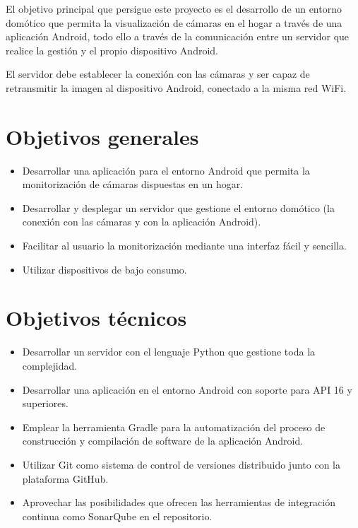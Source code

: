 
El objetivo principal que persigue este proyecto es el desarrollo de un entorno domótico que permita la visualización de cámaras en el hogar a través de una aplicación Android, todo ello a través de la comunicación entre un servidor que realice la gestión y el propio dispositivo Android.

El servidor debe establecer la conexión con las cámaras y ser capaz de retransmitir la imagen al dispositivo Android, conectado a la misma red WiFi. 

\section{Objetivos generales}\label{objetivos-generales}

\begin{itemize}
\tightlist
\item
  Desarrollar una aplicación para el entorno Android que permita la monitorización de cámaras dispuestas en un hogar.
\item
  Desarrollar y desplegar un servidor que gestione el entorno domótico (la conexión con las cámaras y con la aplicación Android).
\item
  Facilitar al usuario la monitorización mediante una interfaz fácil y sencilla.
\item
  Utilizar dispositivos de bajo consumo.
\end{itemize}

\section{Objetivos técnicos}\label{objetivos-tecnicos}

\begin{itemize}
\tightlist
\item
  Desarrollar un servidor con el lenguaje Python que gestione toda la complejidad.
\item
  Desarrollar una aplicación en el entorno Android con soporte para API 16 y superiores.
\item
  Emplear la herramienta Gradle para la automatización del proceso de construcción y compilación de software de la aplicación Android.
\item
  Utilizar Git como sistema de control de versiones distribuido junto con
la plataforma GitHub.
\item
  Aprovechar las posibilidades que ofrecen las herramientas de integración continua como SonarQube en el repositorio.
\end{itemize}


